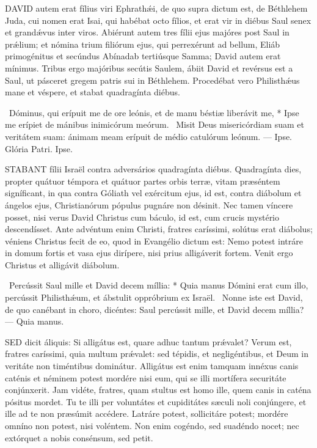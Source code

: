 
\lettrine[lines=2]{D}{AVID} autem erat fílius viri Ephrathǽi, de quo supra dictum est, de Béthlehem Juda, cui nomen erat Isai, qui habébat octo fílios, et erat vir in diébus Saul senex et grandǽvus inter viros. Abiérunt autem tres fílii ejus majóres post Saul in prǽlium; et nómina trium filiórum ejus, qui perrexérunt ad bellum, Eliáb primogénitus et secúndus Abínadab tertiúsque Samma; David autem erat mínimus. Tribus ergo majóribus secútis Saulem, ábiit David et revérsus est a Saul, ut pásceret gregem patris sui in Béthlehem. Procedébat vero Philisthǽus mane et véspere, et stabat quadragínta diébus.

\R\ Dóminus, qui erípuit me de ore leónis, et de manu béstiæ liberávit me, * Ipse me erípiet de mánibus inimicórum meórum. \V\ Misit Deus misericórdiam suam et veritátem suam: ánimam meam erípuit de médio catulórum leónum. --- Ipse. Glória Patri. Ipse.





\lettrine[lines=2]{S}{TABANT} fílii Israël contra adversários quadragínta diébus. Quadragínta dies, propter quátuor témpora et quátuor partes orbis terræ, vitam præséntem signíficant, in qua contra Góliath vel exércitum ejus, id est, contra diábolum et ángelos ejus, Christianórum pópulus pugnáre non désinit. Nec tamen víncere posset, nisi verus David Christus cum báculo, id est, cum crucis mystério descendísset. Ante advéntum enim Christi, fratres caríssimi, solútus erat diábolus; véniens Christus fecit de eo, quod in Evangélio dictum est: Nemo potest intráre in domum fortis et vasa ejus dirípere, nisi prius alligáverit fortem. Venit ergo Christus et alligávit diábolum.

\R\ Percússit Saul mille et David decem míllia: * Quia manus Dómini erat cum illo, percússit Philisthǽum, et ábstulit oppróbrium ex Israël. \V\ Nonne iste est David, de quo canébant in choro, dicéntes: Saul percússit mille, et David decem míllia? --- Quia manus.


\lettrine[lines=2]{S}{ED} dicit áliquis: Si alligátus est, quare adhuc tantum prǽvalet? Verum est, fratres caríssimi, quia multum prǽvalet: sed tépidis, et negligéntibus, et Deum in veritáte non timéntibus dominátur. Alligátus est enim tamquam innéxus canis caténis et néminem potest mordére nisi eum, qui se illi mortífera securitáte conjúnxerit. Jam vidéte, fratres, quam stultus est homo ille, quem canis in caténa pósitus mordet. Tu te illi per voluntátes et cupiditátes sæculi noli conjúngere, et ille ad te non præsúmit accédere. Latráre potest, sollicitáre potest; mordére omníno non potest, nisi voléntem. Non enim cogéndo, sed suadéndo nocet; nec extórquet a nobis consénsum, sed petit.

